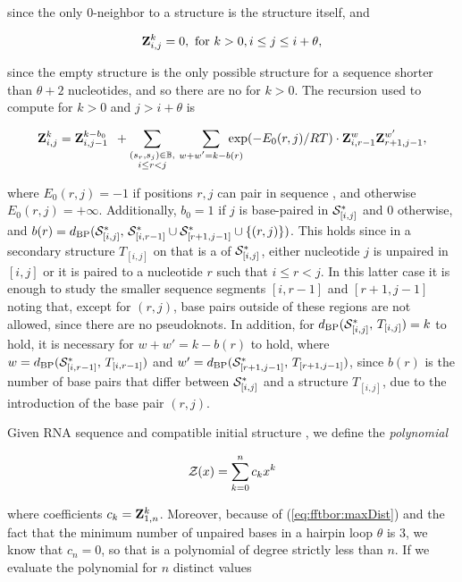 since the only $0$-neighbor to a structure \strSt
is the structure \strSt itself, and

\begin{align}
\label{eq:fftbor:initZpart2}
\bfZ{k}{i,j} = 0, \text{ for } k > 0, i \le j \leq i + \theta,
\end{align}

since the empty structure is the only possible structure for a
sequence shorter than $\theta + 2$ nucleotides, and so there are no
\kNbrs for $k>0$. The recursion used to compute
 for $k > 0$ and $j > i+\theta$ is

\begin{align}
\label{eq:fftbor:bfZkij}
\bfZ{k}{i,j} = \bfZ{k-b_0}{i,j-1}\enspace +
\sum_{\substack{(s_r,s_j) \in \bpSet, \\ i \leq r<j}}\qquad
\sum_{\mathclap{w+w'=k-b(r)}}\enspace
\exp(-E_0(r,j)/RT) \cdot \bfZ{w}{i,r-1} \bfZ{w'}{r+1,j-1},
\end{align}

where $E_0(r,j) = -1$ if positions $r,j$ can pair in sequence \seq,
and otherwise $E_0(r,j) = +\infty$. Additionally,
$b_0 = 1$ if $j$ is base-paired
in $\mathcal S^*_{[i,j]}$ and $0$ otherwise, and
$b(r)=d_{\text{BP}}(\mathcal S^*_{[i,j]},\,\mathcal S^*_{[i,r-1]} \cup \mathcal S^*_{[r+1,j-1]} \cup\{(r,j)\})$.
This holds since in a secondary
structure $T_{[i,j]}$ on \seqIJ that is a \kNbr of
$\mathcal S^*_{[i,j]}$,
either nucleotide $j$ is unpaired in $[i,j]$ or it is
paired to a nucleotide $r$ such that $i \leq r < j$. In this
latter case it is enough to study the smaller sequence segments
$[i,r-1]$ and $[r+1,j-1]$ noting that, except for $(r,j)$,
base pairs outside of these regions are not allowed, since there
are no pseudoknots. In addition,
for $d_{\text{BP}}(\mathcal S^*_{[i,j]},\,T_{[i,j]}) = k$ to hold,
it is necessary for $w+w' = k -b(r)$ to hold, where $w =
d_{\text{BP}}(\mathcal S^*_{[i,r-1]},\,T_{[i,r-1]})$ and $w' =
d_{\text{BP}}(\mathcal S^*_{[r+1,j-1]},\,T_{[r+1,j-1]})$, since $b(r)$ is the
number of base pairs that differ between $\mathcal S^*_{[i,j]}$ and a
structure $T_{[i,j]}$, due to the introduction of the base pair
$(r,j)$.

Given RNA sequence \seq and compatible initial structure \strSt,
we define the {\em polynomial}

\begin{align}
\label{eq:fftbor:zOfX}
\emZ{} = \sum_{k=0}^n c_k x^k
\end{align}

where coefficients $c_k={\bf Z}^{k}_{1,n}$. Moreover, because of
(\ref{eq:fftbor:maxDist}) and the fact that the minimum number of
unpaired bases in a hairpin loop $\theta$ is $3$, we know that $c_n=0$,
so that \emZ{} is a polynomial of degree strictly less than $n$.
If we evaluate the polynomial \emZ{} for $n$ distinct values

